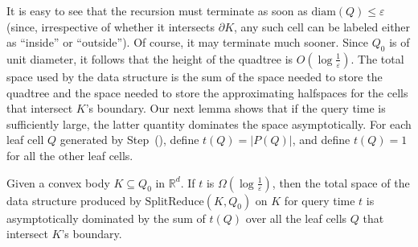 \documentclass[11pt]{article}   \usepackage[letterpaper,hmargin=2.1cm,vmargin=3cm]{geometry}
\newcommand{\RE}{\mathbb{R}}    \newcommand{\ZZ}{\mathbb{Z}}    \newcommand{\eps}{\varepsilon}  \newcommand{\ST}{\,:\,}         \newcommand{\sq}{\square}
\newcommand{\inv}[1]{\frac{1}{#1}}
\newcommand{\alg}{\textrm{SplitReduce}}
\newcommand{\diam}{\mathrm{diam}}
\begin{document}
It is easy to see that the recursion must terminate as soon as $\diam(Q) \le \eps$ (since, irrespective of whether it intersects $\partial K$, any such cell can be labeled either as ``inside'' or ``outside''). Of course, it may terminate much sooner. Since $Q_0$ is of unit diameter, it follows that the height of the quadtree is $O(\log \inv{\eps})$. The total space used by the data structure is the sum of the space needed to store the quadtree and the space needed to store the approximating halfspaces for the cells that intersect $K$'s boundary. Our next lemma shows that if the query time is sufficiently large, the latter quantity dominates the space asymptotically. For each leaf cell $Q$ generated by Step~(\stepapx), define $t(Q) = |P(Q)|$, and define $t(Q) = 1$ for all the other leaf cells.

\begin{lemma} \label{lem:total-space}
Given a convex body $K \subseteq Q_0$ in $\RE^d$. If $t$ is $\Omega(\log \inv{\eps})$, then the total space of the data structure produced by $\alg(K,Q_0)$ on $K$ for query time $t$ is asymptotically dominated by the sum of $t(Q)$ over all the leaf cells $Q$ that intersect $K$'s boundary.
\end{lemma}
\end{document}
